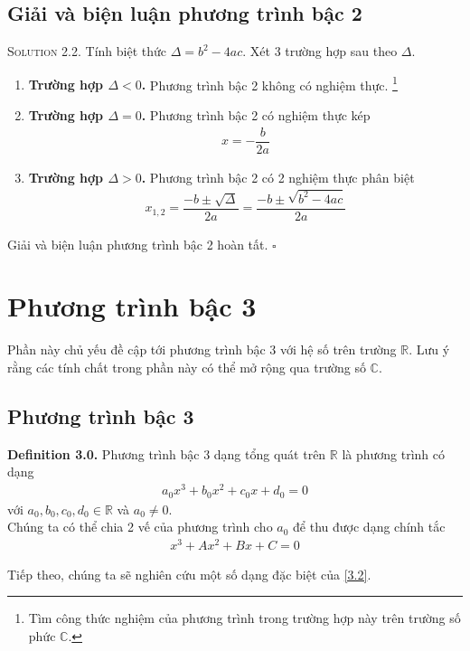 \documentclass[a4paper,oneside]{book}
\numberwithin{equation}{chapter}
\begin{document}
\section{Giải và biện luận phương trình bậc 2}
\textsc{Solution 2.2.} Tính biệt thức $\Delta  = {b^2} - 4ac$. Xét 3 trường hợp sau theo $\Delta$.
\begin{enumerate}
\item \textbf{Trường hợp $\Delta < 0$.} Phương trình bậc 2 không có nghiệm thực. \footnote{Tìm công thức nghiệm của phương trình trong trường hợp này trên trường số phức $\mathbb{C}$.} 
\item \textbf{Trường hợp $\Delta = 0$.} Phương trình bậc 2 có nghiệm thực kép
\begin{align}
x =  - \dfrac{b}{{2a}}
\end{align}
\item \textbf{Trường hợp $\Delta > 0$.} Phương trình bậc 2 có 2 nghiệm thực phân biệt 
\begin{align}
{x_{1,2}} = \dfrac{{ - b \pm \sqrt \Delta  }}{{2a}} = \dfrac{{ - b \pm \sqrt {{b^2} - 4ac} }}{{2a}}
\end{align}
\end{enumerate}
Giải và biện luận phương trình bậc 2 hoàn tất. \hfill $\square$
\chapter{Phương trình bậc 3}
Phần này chủ yếu đề cập tới phương trình bậc 3 với hệ số trên trường $\mathbb{R}$. Lưu ý rằng các tính chất trong phần này có thể mở rộng qua trường số $\mathbb{C}$.
\section{Phương trình bậc 3}
\textbf{Definition 3.0.} Phương trình bậc 3  dạng tổng quát trên $\mathbb{R}$ là phương trình có dạng
\begin{align}
{a_0}{x^3} + {b_0}{x^2} + {c_0}x + {d_0} = 0
\end{align}
với $a_0,b_0,c_0,d_0 \in \mathbb{R}$ và ${a_0} \ne 0$.\\

Chúng ta có thể chia 2 vế của phương trình cho ${a_0}$ để thu được dạng chính tắc
\begin{align}
\label{3.2}
{x^3} + A{x^2} + Bx + C = 0
\end{align}

Tiếp theo, chúng ta sẽ nghiên cứu một số dạng đặc biệt của \eqref{3.2}.
\end{document}
